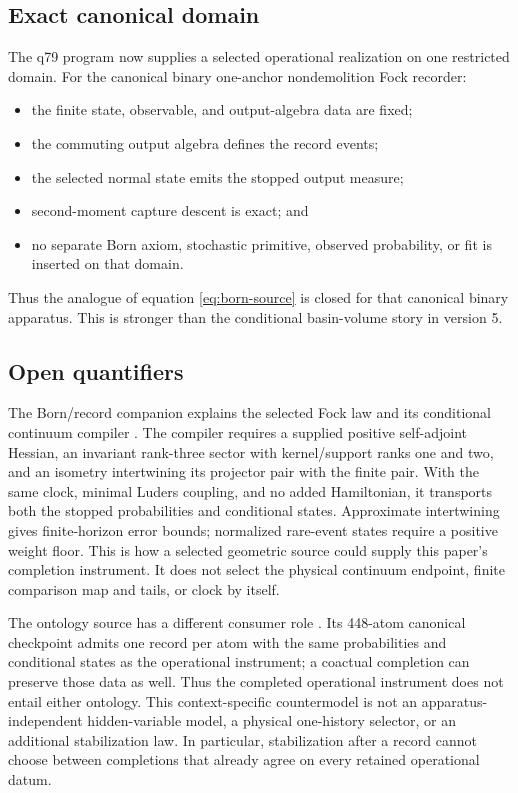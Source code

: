 \documentclass[11pt,a4paper]{article}
\theoremstyle{definition}
\theoremstyle{remark}
\begin{document}
\subsection{Exact canonical domain}

The q79 program now supplies a selected operational realization on one
restricted domain. For the canonical binary one-anchor nondemolition Fock
recorder:
\begin{itemize}
\item the finite state, observable, and output-algebra data are fixed;
\item the commuting output algebra defines the record events;
\item the selected normal state emits the stopped output measure;
\item second-moment capture descent is exact; and
\item no separate Born axiom, stochastic primitive, observed probability, or
fit is inserted on that domain.
\end{itemize}

Thus the analogue of equation \eqref{eq:born-source} is closed for that
canonical binary apparatus. This is stronger than the conditional basin-volume
story in version 5.

\subsection{Open quantifiers}

\label{sec:recorder-source-interface}
The Born/record companion explains the selected Fock law and its conditional
continuum compiler \cite{NeroBornClassical2026,FrozenFock,FrozenContinuum}.
The compiler requires a supplied positive self-adjoint Hessian, an invariant
rank-three sector with kernel/support ranks one and two, and an isometry
intertwining its projector pair with the finite pair. With the same clock,
minimal Luders coupling, and no added Hamiltonian, it transports both the
stopped probabilities and conditional states. Approximate intertwining gives
finite-horizon error bounds; normalized rare-event states require a positive
weight floor. This is how a selected geometric source could supply this
paper's completion instrument. It does not select the physical continuum
endpoint, finite comparison map and tails, or clock by itself.

The ontology source has a different consumer role
\cite{LocalityCompanion,FrozenOntology}. Its 448-atom canonical checkpoint
admits one record per atom with the same probabilities and conditional states
as the operational instrument; a coactual completion can preserve those data
as well. Thus the completed operational instrument does not entail either
ontology. This context-specific countermodel is not an apparatus-independent
hidden-variable model, a physical one-history selector, or an additional
stabilization law. In particular, stabilization after a record cannot choose
between completions that already agree on every retained operational datum.
\end{document}
